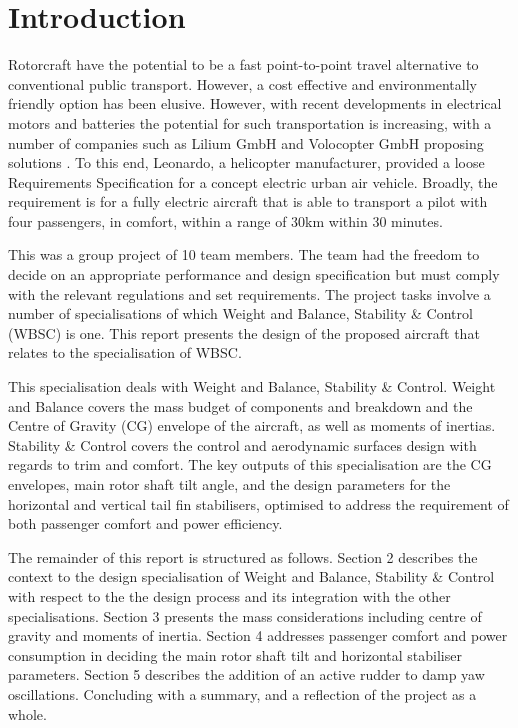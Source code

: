 \documentclass[11pt,a4paper]{article}
\begin{document}
\section{Introduction}
Rotorcraft have the potential to be a fast point-to-point travel alternative to conventional public transport. However, a cost effective and environmentally friendly option has been elusive. However, with recent developments in electrical motors and batteries the potential for such transportation is increasing, with a number of companies such as Lilium GmbH and Volocopter GmbH proposing solutions \cite{bbc}. To this end, Leonardo, a helicopter manufacturer, provided a loose Requirements Specification for a concept electric urban air vehicle. Broadly, the requirement is for a fully electric aircraft that is able to transport a pilot with four passengers, in comfort, within a range of 30km within 30 minutes. 

This was a group project of 10 team members. The team had the freedom to decide on an appropriate performance and design specification but must comply with the relevant regulations and set requirements. The project tasks involve a number of specialisations of which Weight and Balance, Stability \& Control (WBSC) is one. This report presents the design of the proposed aircraft that relates to the specialisation of WBSC.

This specialisation deals with Weight and Balance, Stability \& Control. Weight and Balance covers the mass budget of components and breakdown and the  Centre of Gravity (CG) envelope of the aircraft, as well as moments of inertias. Stability \& Control covers the control and aerodynamic surfaces design with regards to trim and comfort. The key outputs of this specialisation are the CG envelopes, main rotor shaft tilt angle, and the design parameters for the horizontal and vertical tail fin stabilisers, optimised to address the requirement of both passenger comfort and power efficiency.

The remainder of this report is structured as follows. Section 2 describes the context to the design specialisation of Weight and Balance, Stability \& Control with respect to the the design process and its integration with the other specialisations. Section 3 presents the mass considerations including centre of gravity and moments of inertia. Section 4 addresses passenger comfort and power consumption in deciding the main rotor shaft tilt and horizontal stabiliser parameters. Section 5 describes the addition of an active rudder to damp yaw oscillations. Concluding with a summary, and a reflection of the project as a whole.
\end{document}
